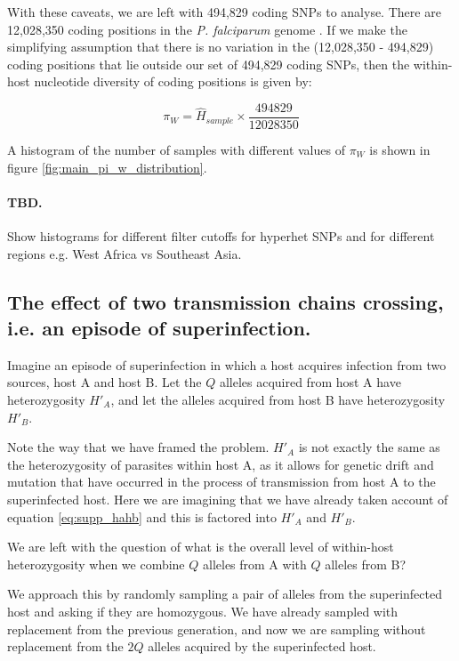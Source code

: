 \documentclass[_main.tex]{subfiles}
\begin{document}
With these caveats, we are left with 494,829 coding SNPs to analyse.   There are 12,028,350 coding positions in the \textit{P. falciparum} genome \cite{Gardner2002}.  If we make the simplifying assumption that there is no variation in the (12,028,350 - 494,829) coding positions that lie outside our set of 494,829 coding SNPs, then the within-host nucleotide diversity of coding positions is given by: 

\begin{equation*}
\pi_W = \widehat{H}_{sample} \times \frac{494829}{12028350}
\end{equation*}

A histogram of the number of samples with different values of $\pi_W$ is shown in figure \ref{fig:main_pi_w_distribution}.  

\paragraph{TBD.}  Show histograms for different filter cutoffs for hyperhet SNPs and for different regions e.g. West Africa vs Southeast Asia.   



\subsection{The effect of two transmission chains crossing, i.e. an episode of superinfection.}
\label{supp_episode_superinfection}

Imagine an episode of superinfection in which a host acquires infection from two sources, host A and host B.  Let the $Q$ alleles acquired from host A have heterozygosity $H'_A$, and let the alleles acquired from host B have heterozygosity $H'_B$.

Note the way that we have framed the problem.  $H'_A$ is not exactly the same as the heterozygosity of parasites within host A, as it allows for genetic drift and mutation that have occurred in the process of transmission from host A to the superinfected host.  Here we are imagining that we have already taken account of equation \ref{eq:supp_hahb} and this is factored into $H'_A$ and $H'_B$.

We are left with the question of what is the overall level of within-host heterozygosity when we combine $Q$ alleles from A with $Q$ alleles from B?  

We approach this by randomly sampling a pair of alleles from the superinfected host and asking if they are homozygous.  We have already sampled with replacement from the previous generation, and now we are sampling without replacement from the $2Q$ alleles acquired by the superinfected host.
\end{document}
